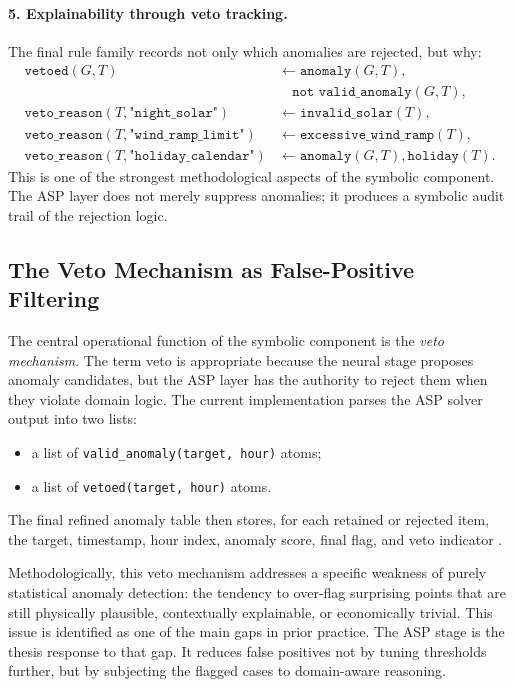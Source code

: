 \paragraph{5. Explainability through veto tracking.}
The final rule family records not only which anomalies are rejected, but why:
\begin{align}
	\texttt{vetoed}(G,T) &\leftarrow \texttt{anomaly}(G,T), \nonumber \\
	&\quad \texttt{not valid\_anomaly}(G,T), \\
	\texttt{veto\_reason}(T,\texttt{"night\_solar"}) &\leftarrow \texttt{invalid\_solar}(T), \\
	\texttt{veto\_reason}(T,\texttt{"wind\_ramp\_limit"}) &\leftarrow \texttt{excessive\_wind\_ramp}(T), \\
	\texttt{veto\_reason}(T,\texttt{"holiday\_calendar"}) &\leftarrow \texttt{anomaly}(G,T), \texttt{holiday}(T).
	\label{eq:veto_reason_rules}
\end{align}
This is one of the strongest methodological aspects of the symbolic component. The ASP layer does not merely suppress anomalies; it produces a symbolic audit trail of the rejection logic.

\subsection{The Veto Mechanism as False-Positive Filtering}

The central operational function of the symbolic component is the \emph{veto mechanism}. The term veto is appropriate because the neural stage proposes anomaly candidates, but the ASP layer has the authority to reject them when they violate domain logic. The current implementation parses the ASP solver output into two lists:
\begin{itemize}
	\item a list of \texttt{valid\_anomaly(target, hour)} atoms;
	\item a list of \texttt{vetoed(target, hour)} atoms.
\end{itemize}
The final refined anomaly table then stores, for each retained or rejected item, the target, timestamp, hour index, anomaly score, final flag, and veto indicator \cite{repo_thesis_grid_anomaly}.

Methodologically, this veto mechanism addresses a specific weakness of purely statistical anomaly detection: the tendency to over-flag surprising points that are still physically plausible, contextually explainable, or economically trivial. This issue is identified as one of the main gaps in prior practice. The ASP stage is the thesis response to that gap. It reduces false positives not by tuning thresholds further, but by subjecting the flagged cases to domain-aware reasoning.

